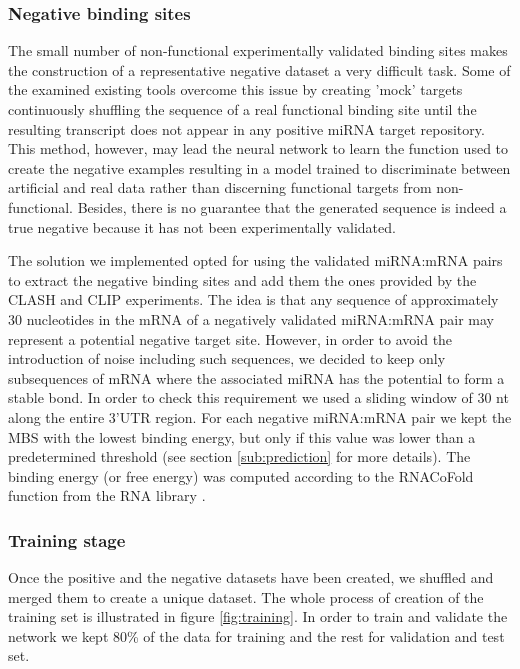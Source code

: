 \subsubsection{Negative binding sites}
The small number of non-functional experimentally validated binding sites makes 
the construction of a representative negative dataset a very difficult task. Some of the examined existing tools overcome this issue by creating 'mock' targets \cite{mirmark} continuously shuffling the sequence of a real functional binding site until the resulting transcript does not appear in any positive miRNA target repository. This method, however, may lead the neural network to learn the function used to create the negative examples resulting in a model trained to discriminate between artificial and real data rather than discerning functional targets from non-functional. Besides, there is no guarantee that the generated sequence is indeed a true negative because it has not been experimentally validated.

The solution we implemented opted for using the validated miRNA:mRNA pairs to extract the negative binding sites and add them the ones provided by the CLASH and CLIP experiments. The idea is that any sequence of approximately 30 nucleotides in the mRNA of a negatively validated miRNA:mRNA pair may represent a potential negative target site. However, in order to avoid the introduction of noise including such sequences, we decided to keep only subsequences of mRNA where the associated miRNA has the potential to form a stable bond. In order to check this requirement we used a sliding window of 30 nt along the entire 3'UTR region. For each negative miRNA:mRNA pair we kept the  MBS with the lowest binding energy, but only if this value was lower than a predetermined threshold (see section \ref{sub:prediction} for more details). The binding energy (or free energy) was  computed according to the RNACoFold function from the RNA library \cite{vienna_rna}.  

\subsubsection{Training stage}
Once the positive and the negative datasets have been created, we shuffled and merged them to create a unique dataset. The whole process of creation of the training set is illustrated in figure \ref{fig:training}. In order to train and validate the network we kept 80\% of the data for training and the rest for validation and test set. 

